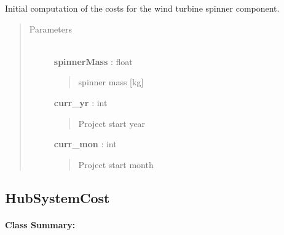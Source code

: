 \documentclass[letterpaper,10pt,openany,oneside]{sphinxmanual}
\begin{document}
\begin{fulllineitems}
\label{documentation:turbine_costSE.src.rotor_costsSE.SpinnerCost}
Initial computation of the costs for the wind turbine spinner component.
\begin{quote}\begin{description}
\item[{Parameters }] \leavevmode\\
\textbf{spinnerMass} : float
\begin{quote}

spinner mass {[}kg{]}
\end{quote}

\textbf{curr\_yr} : int
\begin{quote}

Project start year
\end{quote}

\textbf{curr\_mon} : int
\begin{quote}

Project start month
\end{quote}

\end{description}\end{quote}

\end{fulllineitems}



\subsection{HubSystemCost}
\label{documentation:hubsystemcost}\label{documentation:hubsystemcost-class-label}\paragraph{Class Summary:}
\end{document}
